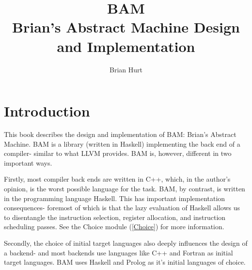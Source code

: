 \documentclass[draft]{book}
\begin{document}
\begin{titlepage}
\title{BAM\\
Brian's Abstract Machine
Design and Implementation}
\author{Brian Hurt}
\maketitle
\end{titlepage}

\tableofcontents
\listoftables
\listoffigures

\chapter{Introduction}

This book describes the design and implementation of BAM: Brian's
Abstract Machine.  BAM is a library (written in Haskell) implementing
the back end of a compiler- similar to what LLVM provides.  BAM is,
however, different in two important ways.

Firstly, most compiler back ends are written in C++, which, in the
author's opinion, is the worst possible language for the task.  BAM, by
contrast, is written in the programming language Haskell.  This has
important implementation consequences- foremost of which is that the
lazy evaluation of Haskell allows us to disentangle the instruction
selection, register allocation, and instruction scheduling passes.  See
the Choice module (\ref{Choice}) for more information.

Secondly, the choice of initial target languages also deeply influences
the design of a backend- and most backends use languages like C++ and
Fortran as initial target languages.  BAM uses Haskell and Prolog as
it's initial languages of choice.


\end{document}
